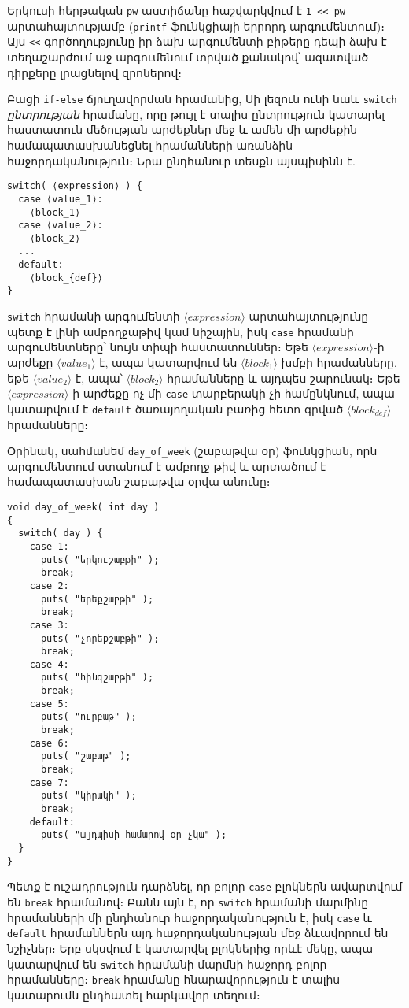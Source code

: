 Երկուսի հերթական \texttt{pw} աստիճանը հաշվարկվում է \texttt{1 << pw}
արտահայտությամբ (\texttt{printf} ֆունկցիայի երրորդ արգումենտում)։ Այս
\verb|<<| գործողությունը իր ձախ արգումենտի բիթերը դեպի ձախ է տեղաշարժում
աջ արգումենում տրված քանակով՝ ազատված դիրքերը լրացնելով զրոներով։

\medskip
Բացի \texttt{if-else} ճյուղավորման հրամանից, Սի լեզուն ունի նաև
\texttt{switch} \emph{ընտրության} հրամանը, որը թույլ է տալիս ընտրություն
կատարել հաստատուն մեծության արժեքներ մեջ և ամեն մի արժեքին համապատասխանեցնել
հրամանների առանձին հաջորդականություն։ Նրա ընդհանուր տեսքն այսպիսինն է.

\begin{verbatim}
switch( ⟨expression⟩ ) {
  case ⟨value_1⟩:
    ⟨block_1⟩
  case ⟨value_2⟩:
    ⟨block_2⟩
  ...
  default:
    ⟨block_{def}⟩
}
\end{verbatim}

\texttt{switch} հրամանի արգումենտի \(\langle expression\rangle\)
արտահայտությունը պետք է լինի ամբողջաթիվ կամ նիշային, իսկ \texttt{case}
հրամանի արգումենտները՝ նույն տիպի հաստատուններ։ Եթե
\(\langle expression\rangle\)-ի արժեքը \(\langle value_1\rangle\) է,
ապա կատարվում են \(\langle block_1\rangle\) խմբի հրամանները, եթե
\(\langle value_2\rangle\) է, ապա՝ \(\langle block_2\rangle\) հրամանները
և այդպես շարունակ։ Եթե \(\langle expression\rangle\)-ի արժեքը ոչ մի
\texttt{case} տարբերակի չի համընկնում, ապա կատարվում է \texttt{default}
ծառայողական բառից հետո գրված \(\langle block_{def}\rangle\) հրամանները։

Օրինակ, սահմանեմ \texttt{day\_of\_week} (շաբաթվա օր) ֆունկցիան, որն
արգումենտում ստանում է ամբողջ թիվ և արտածում է համապատասխան շաբաթվա
օրվա անունը։

\begin{verbatim}
void day_of_week( int day )
{
  switch( day ) {
    case 1:
      puts( "երկուշաբթի" );
      break;
    case 2:
      puts( "երեքշաբթի" );
      break;
    case 3:
      puts( "չորեքշաբթի" );
      break;
    case 4:
      puts( "հինգշաբթի" );
      break;
    case 5:
      puts( "ուրբաթ" );
      break;
    case 6:
      puts( "շաբաթ" );
      break;
    case 7:
      puts( "կիրակի" );
      break;
    default:
      puts( "այդպիսի համարով օր չկա" );
  }
}
\end{verbatim}

Պետք է ուշադրություն դարձնել, որ բոլոր \texttt{case} բլոկներն ավարտվում
են \texttt{break} հրամանով։ Բանն այն է, որ \texttt{switch} հրամանի մարմինը
հրամանների մի ընդհանուր հաջորդականություն է, իսկ \texttt{case} և
\texttt{default} հրամաններն այդ հաջորդականության մեջ ձևավորում են նշիչներ։
Երբ սկսվում է կատարվել բլոկներից որևէ մեկը, ապա կատարվում են \texttt{switch}
հրամանի մարմնի հաջորդ բոլոր հրամանները։ \texttt{break} հրամանը հնարավորություն
է տալիս կատարումն ընդհատել հարկավոր տեղում։

